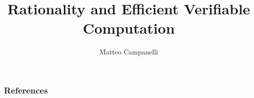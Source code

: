 \documentclass[10pt]{beamer}
\title{Rationality and Efficient Verifiable Computation}
\author{Matteo Campanelli}
\date{}
\begin{document}
	

	

\frame[plain,label=title]{\titlepage}




%

%


 



\begin{frame}
\end{frame}


\begin{frame}[allowframebreaks]
	\frametitle{References}
	
	
\end{frame}





%
%
%
%

%
%
\end{document}
